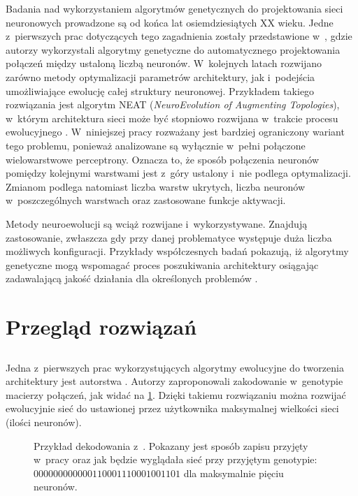 Badania nad wykorzystaniem algorytmów genetycznych
do projektowania sieci neuronowych prowadzone są
od końca lat osiemdziesiątych XX wieku.
Jedne z~pierwszych prac dotyczących tego zagadnienia
zostały przedstawione w~,
gdzie autorzy wykorzystali algorytmy genetyczne
do automatycznego projektowania
połączeń między ustaloną liczbą neuronów.
W~kolejnych latach rozwijano zarówno metody
optymalizacji parametrów architektury,
jak i~podejścia umożliwiające ewolucję
całej struktury neuronowej.
Przykładem takiego rozwiązania jest algorytm NEAT
(\textit{NeuroEvolution of Augmenting Topologies}),
w~którym architektura sieci
może być stopniowo rozwijana
w~trakcie procesu ewolucyjnego%
.
W~niniejszej pracy rozważany jest
bardziej ograniczony wariant tego problemu,
ponieważ analizowane są wyłącznie
w~pełni połączone wielowarstwowe perceptrony.
Oznacza to, że sposób połączenia neuronów
pomiędzy kolejnymi warstwami jest z~góry
ustalony i~nie podlega optymalizacji.
Zmianom podlega natomiast liczba warstw ukrytych,
liczba neuronów w~poszczególnych warstwach
oraz zastosowane funkcje aktywacji.

Metody neuroewolucji są wciąż
rozwijane i~wykorzystywane.
Znajdują zastosowanie, zwłaszcza
gdy przy danej problematyce
występuje duża liczba możliwych konfiguracji.
Przykłady współczesnych badań pokazują,
iż algorytmy genetyczne mogą
wspomagać proces poszukiwania
architektury osiągając
zadawalającą jakość działania
dla określonych problemów%
.

\section{Przegląd rozwiązań}
\tocless\subsection{}
Jedna z~pierwszych prac wykorzystujących
algorytmy ewolucyjne do tworzenia
architektury jest autorstwa
.
Autorzy zaproponowali zakodowanie
w~genotypie macierzy połączeń,
jak widać na \cref{fig:miller1989}.
Dzięki takiemu rozwiązaniu można rozwijać
ewolucyjnie sieć do ustawionej
przez użytkownika maksymalnej
wielkości sieci (ilości neuronów).
\begin{figure}
  \centering
  \resizebox{.95\textwidth}{!}{%
  }
  \caption{
    Przykład dekodowania
    z~.
    Pokazany jest sposób zapisu przyjęty w~pracy
    oraz jak będzie wyglądała sieć
    przy przyjętym genotypie: $
      00000 0  00000 0  11000 1  11000 1 00110 1
    $ dla maksymalnie pięciu neuronów.
  }
  \label{fig:miller1989}
\end{figure}

